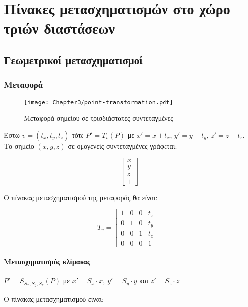 
\chapter{Πίνακες μετασχηματισμών στο χώρο τριών διαστάσεων}

\section{Γεωμετρικοί μετασχηματισμοί}

\subsection{Μεταφορά}

\begin{figure}[hbt]
  \begin{center}
	\texttt{[image: Chapter3/point-transformation.pdf]}
  \end{center}
  \caption{Μεταφορά σημείου σε τρισδιάστατες συντεταγμένες}
\end{figure}



Έστω \( v = (t_x, t_y, t_z) \) τότε \( P' = T_v(P) \) με \( x' = x + t_x \), \( y' = y + t_y \), \( z' = z + t_z \). Το σημείο \((x, y, z)\) σε ομογενείς συντεταγμένες γράφεται:

\[
\begin{bmatrix}
x \\
y \\
z \\
1
\end{bmatrix}
\]

Ο πίνακας μετασχηματισμού της μεταφοράς θα είναι:

\[
T_v =
\begin{bmatrix}
1 & 0 & 0 & t_x \\
0 & 1 & 0 & t_y \\
0 & 0 & 1 & t_z \\
0 & 0 & 0 & 1
\end{bmatrix}
\]

\subsubsection{Μετασχηματισμός κλίμακας}

\( P' = S_{S_x, S_y, S_z} (P) \) με \( x' = S_x \cdot x \), \( y' = S_y\cdot y \) και \( z' = S_z \cdot z \)

Ο πίνακας μετασχηματισμού είναι:

